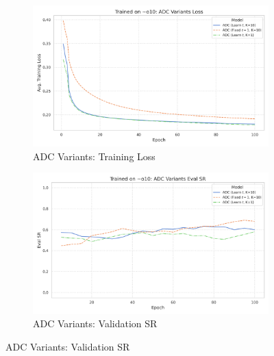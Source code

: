 \begin{figure}[htbp]
    \centering
    \begin{subfigure}[b]{0.48\textwidth}
        \centering
        \includegraphics[width=\textwidth]{trainplotbase/TRAINED_ON_10_OBS/training_curves_focused/condition_o10/adc_variants_train_loss.png}
        \caption{ADC Variants: Training Loss}
        \label{fig:adc_train_loss_10obs}
    \end{subfigure}
    \hfill
    \begin{subfigure}[b]{0.48\textwidth}
        \centering
        \includegraphics[width=\textwidth]{trainplotbase/TRAINED_ON_10_OBS/training_curves_focused/condition_o10/adc_variants_eval_sr.png}
        \caption{ADC Variants: Validation SR}
        \label{fig:adc_val_sr_10obs}
    \end{subfigure}

    \vspace{0.3cm} 


\end{figure}
